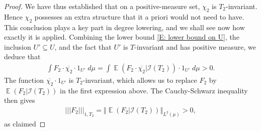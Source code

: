 \documentclass[11pt]{amsart}
\theoremstyle{definition}
\DeclareMathOperator*{\E}{\mathbb{E}}
\newcommand{\CI}{{\mathcal I}}
\newcommand{\norm}[1]{\left\Vert #1\right\Vert}
\newcommand{\nnorm}[1]{\lvert\!|\!| #1|\!|\!\rvert}
\newcommand{\1}{{\mathbf{1}}}
\begin{document}
\begin{proof}
     We have thus established that on a positive-measure set, $\chi_2$ is $T_2$-invariant. %
     Hence $\chi_2$ possesses an extra structure that it a priori would not need to have. This conclusion plays a key part in degree lowering, and we shall see now how exactly it is applied.
     Combining the lower bound \eqref{E: lower bound on U}, the inclusion $U'\subseteq U$, and the fact that $U'$ is $T$-invariant and has positive measure, we deduce that
     \begin{align*}
        \int F_2 \cdot \overline{\chi_2}\cdot 1_{U'}  \; d\mu= \int \E(F_2 \cdot \overline{\chi_2}|\CI(T_2))\cdot 1_{U'}\; d\mu > 0.
     \end{align*}
     The function $\overline{\chi_2}\cdot 1_{U'}$ is $T_2$-invariant, which allows us to replace $F_2$ by $\E(F_2|\CI(T_2))$ in the first expression above. The Cauchy-Schwarz inequality then gives
     \begin{align*}
         \nnorm{F_2}_{1, T_2} = \norm{\E(F_2|\CI(T_2))}_{L^2(\mu)} > 0,
     \end{align*}
     as claimed


\end{proof}
\end{document}

